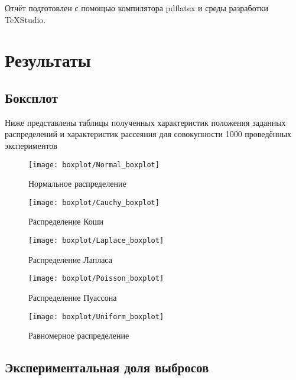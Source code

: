 Отчёт подготовлен с помощью компилятора pdflatex и среды разработки TeXStudio.

\section{Результаты}
\subsection{Боксплот}
Ниже представлены таблицы полученных характеристик положения заданных распределений и характеристик рассеяния для совокупности 1000 проведённых экспериментов

\begin{figure}[H]
	\begin{center}
		\texttt{[image: boxplot/Normal\_boxplot]}
		\caption{Нормальное распределение}
		\label{pic:pic_name}
	\end{center}
\end{figure}


\begin{figure}[H]
	\begin{center}
		\texttt{[image: boxplot/Cauchy\_boxplot]}
		\caption{Распределение Коши}
		\label{pic:pic_name}
	\end{center}
\end{figure}


\begin{figure}[H]
	\begin{center}
		\texttt{[image: boxplot/Laplace\_boxplot]}
		\caption{Распределение Лапласа}
		\label{pic:pic_name}
	\end{center}
\end{figure}

\begin{figure}[H]
	\begin{center}
		\texttt{[image: boxplot/Poisson\_boxplot]}
		\caption{Распределение Пуассона}
		\label{pic:pic_name}
	\end{center}
\end{figure}

\begin{figure}[H]
	\begin{center}
		\texttt{[image: boxplot/Uniform\_boxplot]}
		\caption{Равномерное распределение}
		\label{pic:pic_name}
	\end{center}
\end{figure}

\subsection{Экспериментальная доля выбросов}

